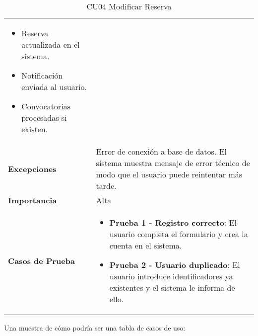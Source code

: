 \begin{table}[H]
\begin{tabularx}{\linewidth}{ p{} p{} }
\begin{itemize}
  			\item Reserva actualizada en el sistema.
			  \item Notificación enviada al usuario.
                \item Convocatorias procesadas si existen.
  		\end{itemize} \\
		\textbf{Excepciones}          &  Error de conexión a base de datos. El sistema muestra mensaje de error técnico de modo que el usuario puede reintentar más tarde.\\
		\textbf{Importancia}          & Alta \\
		\textbf{Casos de Prueba}      &
		\begin{itemize}
			\item \textbf{Prueba 1 - Registro correcto}: El usuario completa el formulario y crea la cuenta en el sistema.
			\item \textbf{Prueba 2 - Usuario duplicado}: El usuario introduce identificadores ya existentes y el sistema le informa de ello.
		\end{itemize} \\
		\bottomrule
	\end{tabularx}
	\caption{CU04 Modificar Reserva}
	\label{cu:modificar-reserva}
\end{table}







Una muestra de cómo podría ser una tabla de casos de uso:


